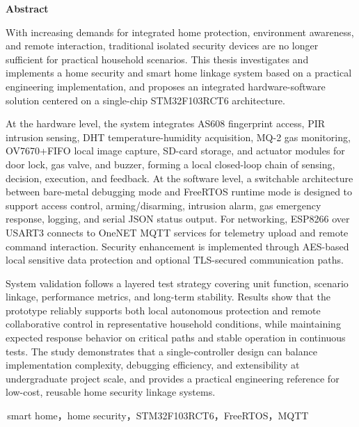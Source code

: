 \documentclass[UTF8,12pt,a4paper,oneside]{ctexbook}
\renewcommand{\headrulewidth}{0pt}
\renewcommand{\footrulewidth}{0pt}
\numberwithin{equation}{chapter}
\begin{document}
\clearpage
{}
\begin{center}
{\bfseries{}Abstract}
\end{center}
\begin{sloppypar}
With increasing demands for integrated home protection, environment awareness, and remote interaction, traditional isolated security devices are no longer sufficient for practical household scenarios. This thesis investigates and implements a home security and smart home linkage system based on a practical engineering implementation, and proposes an integrated hardware-software solution centered on a single-chip STM32F103RCT6 architecture.

At the hardware level, the system integrates AS608 fingerprint access, PIR intrusion sensing, DHT temperature-humidity acquisition, MQ-2 gas monitoring, OV7670+FIFO local image capture, SD-card storage, and actuator modules for door lock, gas valve, and buzzer, forming a local closed-loop chain of sensing, decision, execution, and feedback. At the software level, a switchable architecture between bare-metal debugging mode and FreeRTOS runtime mode is designed to support access control, arming/disarming, intrusion alarm, gas emergency response, logging, and serial JSON status output. For networking, ESP8266 over USART3 connects to OneNET MQTT services for telemetry upload and remote command interaction. Security enhancement is implemented through AES-based local sensitive data protection and optional TLS-secured communication paths.

System validation follows a layered test strategy covering unit function, scenario linkage, performance metrics, and long-term stability. Results show that the prototype reliably supports both local autonomous protection and remote collaborative control in representative household conditions, while maintaining expected response behavior on critical paths and stable operation in continuous tests. The study demonstrates that a single-controller design can balance implementation complexity, debugging efficiency, and extensibility at undergraduate project scale, and provides a practical engineering reference for low-cost, reusable home security linkage systems.
\end{sloppypar}

\vspace{1\baselineskip}
\,smart home，home security，STM32F103RCT6，FreeRTOS，MQTT

\mainmatter
\pagestyle{fancy}
\fancyhf{}
\fancyfoot[R]{\rmfamily\fontsize{9pt}{9pt}\selectfont\thepage}
\renewcommand{\headrulewidth}{0pt}
\renewcommand{\footrulewidth}{0pt}
\setcounter{page}{1}
\end{document}
